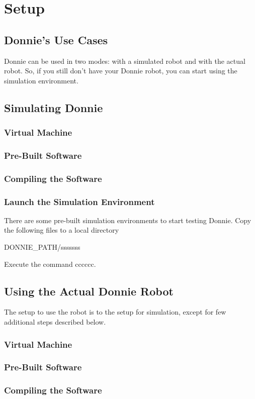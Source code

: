 \chapter{Setup}

\section{Donnie's Use Cases}
\label{sec:user_case}

Donnie can be used in two modes: with a simulated robot and with the actual robot.
So, if you still don’t have your Donnie robot, you can start using the simulation environment.


\section{Simulating Donnie}
\label{sec:sim}

\subsection{Virtual Machine}

\subsection{Pre-Built Software}

\subsection{Compiling the Software}

\subsection{Launch the Simulation Environment}

There are some pre-built simulation environments to start testing Donnie.
Copy the following files to a local directory

DONNIE\_PATH/sssssss

Execute the command cccccc.


\section{Using the Actual Donnie Robot}
\label{sec:robot}

The setup to use the robot is to the setup for simulation, except for few additional steps described below.

\subsection{Virtual Machine}

\subsection{Pre-Built Software}

\subsection{Compiling the Software}

